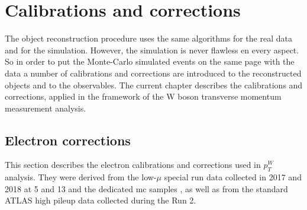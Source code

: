 \chapter{Calibrations and corrections}
    The object reconstruction procedure uses the same algorithms for the real data and for the simulation. However, the simulation is never flawless en every aspect. So in order to put the Monte-Carlo simulated events on the same page with the data a number of calibrations and corrections are introduced to the reconstructed objects and to the observables. The current chapter describes the calibrations and corrections, applied in the framework of the W boson transverse momentum measurement analysis.
    \section{Electron corrections}
    This section describes the electron calibrations and corrections used in $p_T^W$ analysis. They were derived from the low-$\mu$ special run data collected in 2017 and 2018 at 5 and 13 \tev{} and the dedicated \gls{mc} samples \cite{Kretzschmar:2657141}, as well as from the standard ATLAS high pileup data collected during the Run 2.
